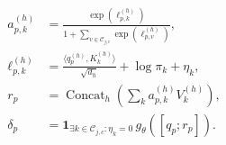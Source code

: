 \begin{equation}
 \begin{split}
  a^{(h)}_{p,k}&=\frac{\exp(\ell^{(h)}_{p,k})}
   {1+\sum_{v\in\mathcal C_{j,c}}\exp(\ell^{(h)}_{p,v})},\\
  \ell^{(h)}_{p,k}&=\frac{\langle q^{(h)}_{p},K^{(h)}_k\rangle}{\sqrt{d_h}}
      +\log\pi_k+\eta_k,\\
  r_p&=\operatorname{Concat}_h\!\left(\sum_k a^{(h)}_{p,k}V^{(h)}_k\right),\\
  \delta_p&=\mathbf{1}_{\exists k\in\mathcal C_{j,c}:\eta_k=0}\,g_\theta([q_p;r_p]).
 \end{split}\label{eq:attention}
\end{equation}
